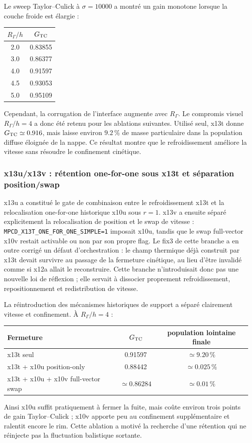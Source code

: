 \documentclass[11pt,a4paper]{article}
\begin{document}
Le sweep Taylor--Culick à $\sigma=10000$ a montré un gain monotone lorsque la couche froide est élargie :
\begin{center}
\begin{tabular}{cc}
\toprule
$R_\Gamma/h$ & $G_{\rm TC}$ \\
\midrule
2.0 & 0.83855 \\
3.0 & 0.86377 \\
4.0 & 0.91597 \\
4.5 & 0.93053 \\
5.0 & 0.95109 \\
\bottomrule
\end{tabular}
\end{center}
Cependant, la corrugation de l'interface augmente avec $R_\Gamma$. Le compromis visuel $R_\Gamma/h=4$ a donc été retenu pour les ablations suivantes. Utilisé seul, x13t donne $G_{\rm TC}\simeq0.916$, mais laisse environ $9.2\,\%$ de masse particulaire dans la population diffuse éloignée de la nappe. Ce résultat montre que le refroidissement améliore la vitesse sans résoudre le confinement cinétique.

\subsubsection{x13u/x13v : rétention one-for-one sous x13t et séparation position/swap}

x13u a constitué le gate de combinaison entre le refroidissement x13t et la relocalisation one-for-one historique x10u sous $r=1$. x13v a ensuite séparé explicitement la relocalisation de position et le swap de vitesse :
\texttt{MPCD\_X13T\_ONE\_FOR\_ONE\_SIMPLE=1} imposait x10u, tandis que le swap full-vector x10v restait activable ou non par son propre flag. Le fix3 de cette branche a en outre corrigé un défaut d'orchestration : le champ thermique déjà construit par x13t devait survivre au passage de la fermeture cinétique, au lieu d'être invalidé comme si x12a allait le reconstruire. Cette branche n'introduisait donc pas une nouvelle loi de réflexion ; elle servait à dissocier proprement refroidissement, repositionnement et redistribution de vitesse.

La réintroduction des mécanismes historiques de support a séparé clairement vitesse et confinement. À $R_\Gamma/h=4$ :
\begin{center}
\begin{tabular}{lcc}
\toprule
Fermeture & $G_{\rm TC}$ & population lointaine finale \\
\midrule
x13t seul & 0.91597 & $\simeq9.20\,\%$ \\
x13t + x10u position-only & 0.88442 & $\simeq0.025\,\%$ \\
x13t + x10u + x10v full-vector swap & $\simeq0.86284$ & $\simeq0.01\,\%$ \\
\bottomrule
\end{tabular}
\end{center}
Ainsi x10u suffit pratiquement à fermer la fuite, mais coûte environ trois points de gain Taylor--Culick ; x10v apporte peu au confinement supplémentaire et ralentit encore le rim. Cette ablation a motivé la recherche d'une rétention qui ne réinjecte pas la fluctuation balistique sortante.
\end{document}
